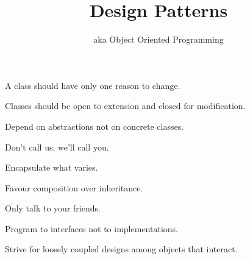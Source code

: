 \documentclass{beamer}
\title{Design Patterns}
\subtitle{aka Object Oriented Programming}
\begin{document}
\begin{frame}
  \titlepage
\end{frame}

\begin{frame}{A class should have only one reason to change.}
\end{frame}

\begin{frame}{Classes should be open to extension and closed for modification.}
\end{frame}

\begin{frame}{Depend on abstractions not on concrete classes.}
\end{frame}

\begin{frame}{Don't call us, we'll call you.}
\end{frame}

\begin{frame}{Encapsulate what varies.}
\end{frame}

\begin{frame}{Favour composition over inheritance.}
\end{frame}

\begin{frame}{Only talk to your friends.}
\end{frame}

\begin{frame}{Program to interfaces not to implementations.}
\end{frame}

\begin{frame}{Strive for loosely coupled designs among objects that interact.}
\end{frame}
\end{document}
